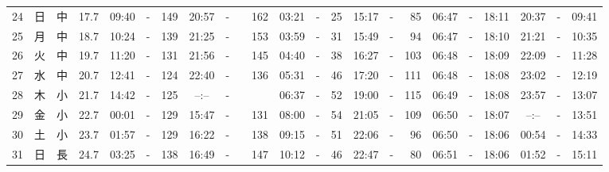 \documentclass[12pt,a4j]{jsarticle}
\begin{document}
\begin{table}[htbp]
\begin{center}
{\begin{tabular}{|rc|cr|ccrccr|ccrccr|ccc|ccc|}
24 & 日 & 中 & 17.7 &  09:40 &-& 149 &  20:57 &-& 162 &  03:21 &-&  25 &  15:17 &-&  85 & 06:47 & -& 18:11 & 20:37 & -& 09:41 \\
25 & 月 & 中 & 18.7 &  10:24 &-& 139 &  21:25 &-& 153 &  03:59 &-&  31 &  15:49 &-&  94 & 06:47 & -& 18:10 & 21:21 & -& 10:35 \\
26 & 火 & 中 & 19.7 &  11:20 &-& 131 &  21:56 &-& 145 &  04:40 &-&  38 &  16:27 &-& 103 & 06:48 & -& 18:09 & 22:09 & -& 11:28 \\
27 & 水 & 中 & 20.7 &  12:41 &-& 124 &  22:40 &-& 136 &  05:31 &-&  46 &  17:20 &-& 111 & 06:48 & -& 18:08 & 23:02 & -& 12:19 \\
28 & 木 & 小 & 21.7 &  14:42 &-& 125 &  --:-- &-&~~~~~ &  06:37 &-&  52 &  19:00 &-& 115 & 06:49 & -& 18:08 & 23:57 & -& 13:07 \\
29 & 金 & 小 & 22.7 &  00:01 &-& 129 &  15:47 &-& 131 &  08:00 &-&  54 &  21:05 &-& 109 & 06:50 & -& 18:07 & --:-- & -& 13:51 \\
30 & 土 & 小 & 23.7 &  01:57 &-& 129 &  16:22 &-& 138 &  09:15 &-&  51 &  22:06 &-&  96 & 06:50 & -& 18:06 & 00:54 & -& 14:33 \\
31 & 日 & 長 & 24.7 &  03:25 &-& 138 &  16:49 &-& 147 &  10:12 &-&  46 &  22:47 &-&  80 & 06:51 & -& 18:06 & 01:52 & -& 15:11 \\
   \hline
   \end{tabular}}
   \end{center}
\end{table}
\newpage
\end{document}
